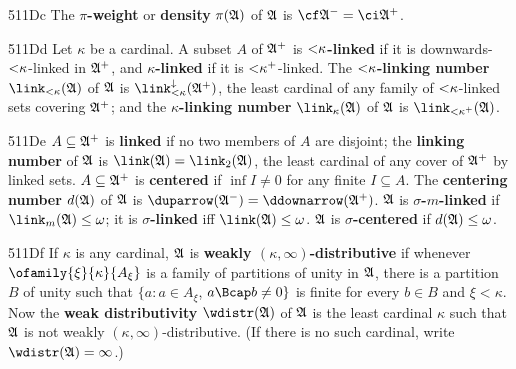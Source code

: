 

\spheader 511Dc The {\bf $\pi$-weight} or {\bf density}
$\pi(\frak A)$ of $\frak A$ is
$\cf\frak A^-=\ci\frak A^+$.

\spheader 511Dd Let $\kappa$ be a cardinal.   A subset $A$ of
$\frak A^+$ is {\bf $\hbox{$<$}\kappa$-linked} if it is
downwards-$\hbox{$<$}\kappa$-linked in $\frak A^+$, and {\bf $\kappa$-linked} if it is
$\hbox{$<$}\kappa^+$-linked.
The {\bf $\hbox{$<$}\kappa$-linking number}
$\link_{<\kappa}(\frak A)$ of $\frak A$ is
$\link_{<\kappa}^{\downarrow}(\frak A^+)$,
the least cardinal of any family of
$\hbox{$<$}\kappa$-linked sets covering $\frak A^+$;  and the
{\bf $\kappa$-linking number} $\link_{\kappa}(\frak A)$ of $\frak A$ is
$\link_{<\kappa^+}(\frak A)$.

\spheader 511De $A\subseteq\frak A^+$ is
{\bf linked} if no two members of $A$ are disjoint;  the
{\bf linking number} of $\frak A$ is $\link(\frak A)=\link_2(\frak A)$,
the least cardinal of any cover of $\frak A^+$ by linked sets.
$A\subseteq\frak A^+$ is {\bf centered} if
$\inf I\ne 0$ for any finite $I\subseteq A$.   The {\bf centering
number}
$d(\frak A)$ of $\frak A$ is
$\duparrow(\frak A^-)=\ddownarrow(\frak A^+)$.
$\frak A$ is {\bf $\sigma$-$m$-linked} if
$\link_m(\frak A)\le\omega$;   it is
{\bf $\sigma$-linked} iff $\link(\frak A)\le\omega$.
$\frak A$ is {\bf $\sigma$-centered} if $d(\frak A)\le\omega$.

\spheader 511Df If $\kappa$ is any cardinal, $\frak A$ is {\bf weakly
$(\kappa,\infty)$-distributive} if whenever
$\ofamily{\xi}{\kappa}{A_{\xi}}$ is a family of partitions of unity in
$\frak A$, there is a partition $B$ of unity such that
$\{a:a\in A_{\xi}$, $a\Bcap b\ne 0\}$ is finite for every $b\in B$ and
$\xi<\kappa$.    Now the {\bf weak distributivity} $\wdistr(\frak A)$ of
$\frak A$ is the least cardinal $\kappa$ such that $\frak A$ is not
weakly $(\kappa,\infty)$-distributive.   (If there is no such cardinal,
write $\wdistr(\frak A)=\infty$.)

